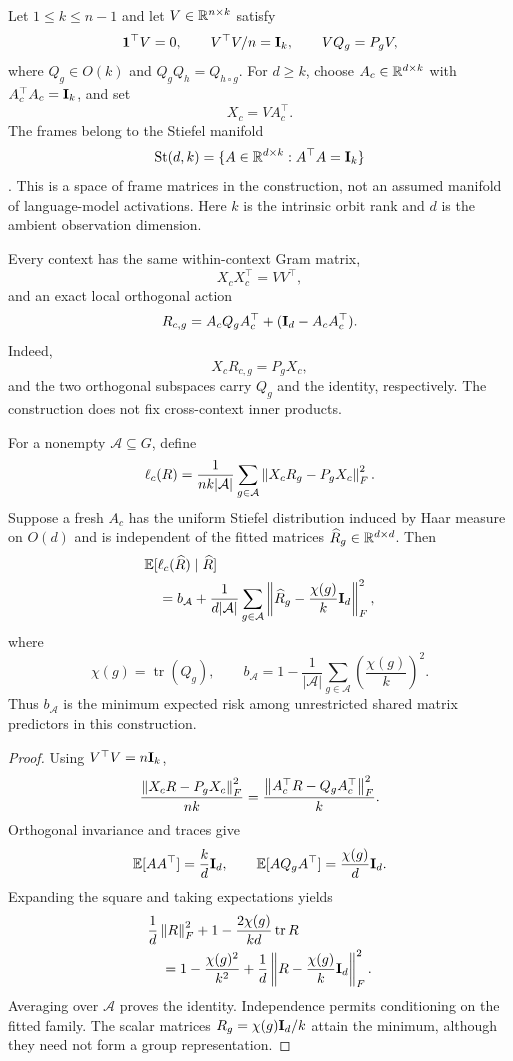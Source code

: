Let $1\leq k\leq n-1$ and let
$V\in\mathbb{R}^{n\times k}$ satisfy
\[
 \mathbf1^\top V=0,
 \qquad
 V^\top V/n=\mathbf{I}_k,
 \qquad
 VQ_g=P_gV,
\]
where $Q_g\in O(k)$ and
$Q_gQ_h=Q_{h\circ g}$.
For $d\geq k$, choose
$A_c\in\mathbb{R}^{d\times k}$ with
$A_c^\top A_c=\mathbf{I}_k$, and set
\[
 X_c=VA_c^\top.
\]
The frames belong to the Stiefel manifold
\[
 \mathrm{St}(d,k)
 =\{A\in\mathbb{R}^{d\times k}:A^\top A=\mathbf{I}_k\}
\]
\citep{edelman1998geometry}.
This is a space of frame matrices in the construction,
not an assumed manifold of language-model activations.
Here $k$ is the intrinsic orbit rank and $d$ is the
ambient observation dimension.

Every context has the same within-context Gram matrix,
\[
 X_cX_c^\top=VV^\top,
\]
and an exact local orthogonal action
\[
 R_{c,g}
 =A_cQ_gA_c^\top+(\mathbf{I}_d-A_cA_c^\top).
\]
Indeed,
\[
 X_cR_{c,g}=P_gX_c,
\]
and the two orthogonal subspaces carry $Q_g$ and the
identity, respectively.
The construction does not fix cross-context inner
products.

\begin{proposition}
\label{prop:orientation}
For a nonempty $\mathcal A\subseteq G$, define
\[
 \ell_c(R)
 =\frac{1}{nk|\mathcal A|}
   \sum_{g\in\mathcal A}
   \left\lVert X_cR_g-P_gX_c\right\rVert_F^2.
\]
Suppose a fresh $A_c$ has the uniform Stiefel distribution
induced by Haar measure on $O(d)$ and is independent of
the fitted matrices $\widehat R_g\in\mathbb{R}^{d\times d}$.
Then
\begin{equation}
\begin{aligned}
 &\mathbb E[\ell_c(\widehat R)\mid\widehat R]\\
 &\quad=
 b_{\mathcal A}
 +\frac{1}{d|\mathcal A|}
  \sum_{g\in\mathcal A}
  \left\lVert \widehat R_g-\frac{\chi(g)}k\mathbf{I}_d\right\rVert_F^2,
\end{aligned}
\end{equation}
where
\[
 \chi(g)=\operatorname{tr}(Q_g),
 \qquad
 b_{\mathcal A}
 =1-\frac1{|\mathcal A|}
       \sum_{g\in\mathcal A}
       \left(\frac{\chi(g)}k\right)^2.
\]
Thus $b_{\mathcal A}$ is the minimum expected risk among
unrestricted shared matrix predictors in this
construction.
\end{proposition}

\begin{proof}
Using $V^\top V=n\mathbf{I}_k$,
\[
 \frac{\left\lVert X_cR-P_gX_c\right\rVert_F^2}{nk}
 =
 \frac{\left\lVert A_c^\top R-Q_gA_c^\top\right\rVert_F^2}{k}.
\]
Orthogonal invariance and traces give
\[
 \mathbb E[AA^\top]=\frac{k}{d}\mathbf{I}_d,
 \qquad
 \mathbb E[AQ_gA^\top]=\frac{\chi(g)}d\mathbf{I}_d.
\]
Expanding the square and taking expectations yields
\begin{align*}
 &\frac1d\left\lVert R\right\rVert_F^2+1
   -\frac{2\chi(g)}{kd}\operatorname{tr}R\\
 &\quad=
 1-\frac{\chi(g)^2}{k^2}
 +\frac1d
  \left\lVert R-\frac{\chi(g)}k\mathbf{I}_d\right\rVert_F^2.
\end{align*}
Averaging over $\mathcal A$ proves the identity.
Independence permits conditioning on the fitted family.
The scalar matrices
$R_g=\chi(g)\mathbf{I}_d/k$ attain the minimum, although they
need not form a group representation.
\end{proof}

